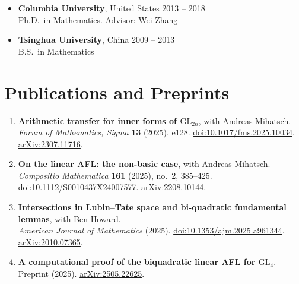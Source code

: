 \documentclass[a4paper,11pt]{article}
\newcommand{\dates}[1]{\hfill{\small #1}}
\begin{document}
\begin{itemize}[label={}]
  \item \textbf{Columbia University}, United States \dates{2013 -- 2018}\\
        Ph.D.\ in Mathematics. Advisor: Wei Zhang
  \item \textbf{Tsinghua University}, China \dates{2009 -- 2013}\\
        B.S.\ in Mathematics
\end{itemize}

\section{Publications and Preprints}

\begin{enumerate}[leftmargin=1.6em, itemsep=.55em, topsep=.4em, parsep=0pt]

  \item \textbf{Arithmetic transfer for inner forms of $\mathrm{GL}_{2n}$},
        with Andreas Mihatsch.\\
        \emph{Forum of Mathematics, Sigma} \textbf{13} (2025), e128.
        \href{https://doi.org/10.1017/fms.2025.10034}{doi:10.1017/fms.2025.10034}.
        \href{https://arxiv.org/abs/2307.11716}{arXiv:2307.11716}.

  \item \textbf{On the linear AFL: the non-basic case},
        with Andreas Mihatsch.\\
        \emph{Compositio Mathematica} \textbf{161} (2025), no.~2, 385--425.
        \href{https://doi.org/10.1112/S0010437X24007577}{doi:10.1112/S0010437X24007577}.
        \href{https://arxiv.org/abs/2208.10144}{arXiv:2208.10144}.

  \item \textbf{Intersections in Lubin--Tate space and bi-quadratic fundamental lemmas},
        with Ben Howard.\\
        \emph{American Journal of Mathematics} (2025).
        \href{https://doi.org/10.1353/ajm.2025.a961344}{doi:10.1353/ajm.2025.a961344}.
        \href{https://arxiv.org/abs/2010.07365}{arXiv:2010.07365}.

  \item \textbf{A computational proof of the biquadratic linear AFL for $\mathrm{GL}_4$}.\\
        Preprint (2025). \href{https://arxiv.org/abs/2505.22625}{arXiv:2505.22625}.


\end{enumerate}
\end{document}
